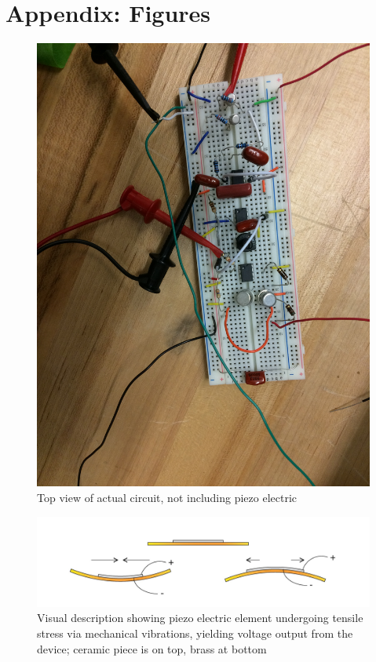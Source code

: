 \documentclass{article}
\begin{document}
\section{Appendix: Figures}
    \begin{figure}[H]
        \centering
        \includegraphics[scale = 0.07]{Auto2.JPG}
        \caption{Top view of actual circuit, not including piezo electric}
        \label{fig:my_label}
    \end{figure}
    \begin{figure}[H]
        \centering
        \includegraphics[scale = 0.5]{Piezo_bending_principle.jpg}
        \caption{Visual description showing piezo electric element undergoing tensile stress via mechanical vibrations, yielding voltage output from the device; ceramic piece is on top, brass at bottom \cite{wiki2}}
        \label{fig:my_label}
    \end{figure}
\end{document}
